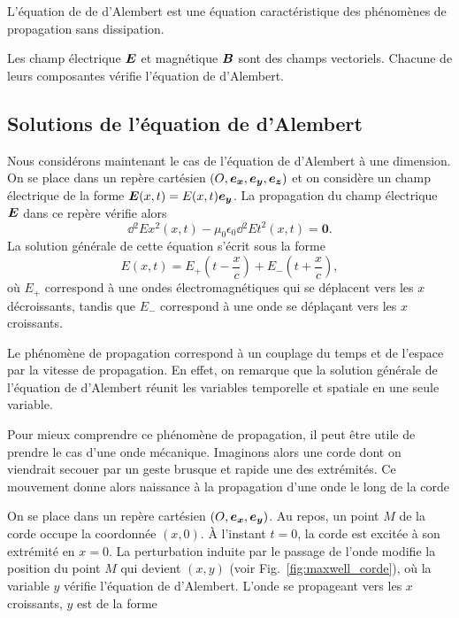 \begin{rem}
	L'équation de de d'Alembert est une équation caractéristique des phénomènes
	de propagation sans dissipation.
\end{rem}

Les champ électrique $\vece$ et magnétique $\vecb$ sont des champs vectoriels.
Chacune de leurs composantes vérifie l'équation de d'Alembert.

\subsection{Solutions de l'équation de d'Alembert}
Nous considérons maintenant le cas de l'équation de d'Alembert à une dimension.
On se place dans un repère cartésien $(O, \ex, \ey, \ez)$ et on considère
un champ électrique de la forme $\vece(x, t) = E(x, t)\ey$.
La propagation du champ électrique $\vece$ dans ce repère vérifie alors 
\begin{equation*}
	\dd{^2 E}{x^2}(x, t) - \mu_0 \epsilon_0 \dd{^2 E}{t^2}(x, t) = \mathbf{0}.
\end{equation*}
La solution générale de cette équation s'écrit sous la forme
\begin{equation*}
	E(x, t) = E_+\left(t - \frac{x}{c}\right) + E_- \left(t + \frac{x}{c}\right),
\end{equation*}
où $E_+$ correspond à une ondes électromagnétiques qui se déplacent vers 
les $x$ décroissants, tandis que $E_-$ correspond à une onde se déplaçant vers 
les $x$ croissants.

\begin{rem}
	Le phénomène de propagation correspond à un couplage du temps et 
	de l'espace par la vitesse de propagation. En effet, on remarque que 
	la solution générale de l'équation de d'Alembert réunit les variables
	temporelle et spatiale en une seule variable.
\end{rem}

Pour mieux comprendre ce phénomène de propagation, il peut être utile de prendre
le cas d'une onde mécanique. Imaginons alors une corde dont on viendrait secouer par un
geste brusque et rapide une des extrémités. Ce mouvement donne alors naissance
à la propagation d'une onde le long de la corde


On se place dans un repère cartésien $(O, \ex, \ey)$. 
 Au repos, un point $M$ de la corde occupe la coordonnée $(x, 0)$.
À l'instant $t = 0$, la corde est excitée à son extrémité en 
$x = 0$. La perturbation induite par le passage de l'onde modifie la position
du point $M$ qui devient $(x, y)$ (voir Fig.~\ref{fig:maxwell_corde}), 
où la variable $y$ vérifie l'équation de 
d'Alembert. L'onde se propageant vers les $x$ croissants, $y$ est de la forme

